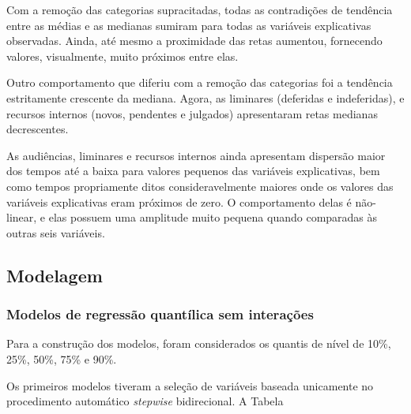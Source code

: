 Com a remoção das categorias supracitadas, todas as contradições de tendência entre as médias e as medianas sumiram para todas as variáveis explicativas observadas. Ainda, até mesmo a proximidade das retas aumentou, fornecendo valores, visualmente, muito próximos entre elas.

Outro comportamento que diferiu com a remoção das categorias foi a tendência estritamente crescente da mediana. Agora, as liminares (deferidas e indeferidas), e recursos internos (novos, pendentes e julgados) apresentaram retas medianas decrescentes.

As audiências, liminares e recursos internos ainda apresentam dispersão maior dos tempos até a baixa para valores pequenos das variáveis explicativas, bem como tempos propriamente ditos consideravelmente maiores onde os valores das variáveis explicativas eram próximos de zero. O comportamento delas é não-linear, e elas possuem uma amplitude muito pequena quando comparadas às outras seis variáveis.

\newpage
\subsection{Modelagem}
\subsubsection{Modelos de regressão quantílica sem interações}
Para a construção dos modelos, foram considerados os quantis de nível de 10\%, 25\%, 50\%, 75\% e 90\%.

Os primeiros modelos tiveram a seleção de variáveis baseada unicamente no procedimento automático \textit{stepwise} bidirecional. A Tabela 